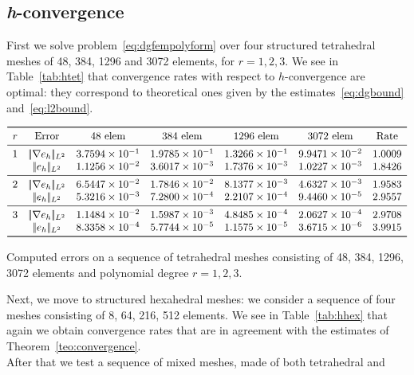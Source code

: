 \documentclass[12pt, a4paper]{article}
\theoremstyle{definition}
\theoremstyle{plain}
\theoremstyle{plain}
\theoremstyle{definition}
\begin{document}
\subsection{\textit{h}-convergence}
First we solve problem~\eqref{eq:dgfempolyform} over four structured 
tetrahedral meshes of 48, 
384, 1296 and 3072 elements, for $r=1,2,3$. We see in Table~\ref{tab:htet} that 
convergence rates with respect to $h$-convergence are optimal: they correspond 
to theoretical ones given by the estimates~\eqref{eq:dgbound} 
and~\eqref{eq:l2bound}.\\
\begin{table}[h]\footnotesize
	\centering
	\[
	\begin{array}{ccccccc}
	\toprule
	r & \text{Error} & \text{48 elem} & \text{384 elem} & \text{1296 elem} & 
	\text{3072 elem} & \text{Rate} \\ 
	\midrule
	1 & |\!|\nabla e_{h}|\!|_{L^2}   & 3.7594 \times 10^{-1} & 1.9785 \times 10^{-1} & 1.3266 \times 10^{-1} & 9.9471 \times 10^{-2} & 1.0009\\
	& |\!|e_{h}|\!|_{L^2} & 1.1256 \times 10^{-2} & 3.6017 \times 10^{-3} & 1.7376 \times 10^{-3} & 1.0227 \times 10^{-3} & 1.8426\\
	\midrule
	2 & |\!|\nabla e_{h}|\!|_{L^2}   & 6.5447 \times 10^{-2} & 1.7846 \times 10^{-2} & 8.1377 \times 10^{-3} & 4.6327 \times 10^{-3} & 1.9583\\
	& |\!|e_{h}|\!|_{L^2} & 5.3216 \times 10^{-3} & 7.2800 \times 10^{-4} & 2.2107 \times 10^{-4} & 9.4460 \times 10^{-5} & 2.9557\\
	\midrule
	3 & |\!|\nabla e_{h}|\!|_{L^2}   & 1.1484 \times 10^{-2} & 1.5987 \times 10^{-3} & 4.8485 \times 10^{-4} & 2.0627 \times 10^{-4} & 2.9708\\
	& |\!|e_{h}|\!|_{L^2} & 8.3358 \times 10^{-4} & 5.7744 \times 10^{-5} & 1.1575 \times 10^{-5} & 3.6715 \times 10^{-6} & 3.9915\\
	\bottomrule
	\end{array}
	\]
	\caption{Computed errors on a sequence of tetrahedral meshes consisting of 
	48, 384, 1296, 3072 elements and polynomial degree $r=1,2,3$.} \label{tab:htet}
\end{table}
Next, we move to structured hexahedral meshes: we consider a sequence of four 
meshes consisting of 8, 64, 216, 512 elements. We see in 
Table~\ref{tab:hhex} that again we obtain convergence rates that are in 
agreement with the estimates of Theorem~\ref{teo:convergence}.\\
After that we test a sequence of mixed meshes, made of both tetrahedral and 
\end{document}
